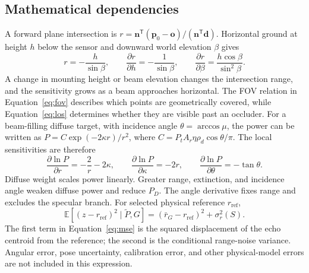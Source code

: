 \documentclass[11pt,letterpaper]{article}
\newcommand{\vect}[1]{\mathbf #1}
\begin{document}
\subsection{Mathematical dependencies}
A forward plane intersection is $r=\vect n^{\mathsf T}(\vect p_0-\vect o)/(\vect n^{\mathsf T}\vect d)$. Horizontal ground at height $h$ below the sensor and downward world elevation $\beta$ gives
\begin{equation}\label{eq:height}
r=-\frac{h}{\sin\beta},\qquad \frac{\partial r}{\partial h}=-\frac1{\sin\beta},\qquad
\frac{\partial r}{\partial\beta}=\frac{h\cos\beta}{\sin^2\beta}.
\end{equation}
A change in mounting height or beam elevation changes the intersection range, and the sensitivity grows as a beam approaches horizontal. The FOV relation in Equation~\eqref{eq:fov} describes which points are geometrically covered, while Equation~\eqref{eq:los} determines whether they are visible past an occluder. For a beam-filling diffuse target, with incidence angle $\theta=\arccos\mu$, the power can be written as $P=C\exp(-2\kappa r)/r^2$, where $C=P_tA_r\eta\rho_d\cos\theta/\pi$. The local sensitivities are therefore
\begin{equation}\label{eq:derivatives}
\frac{\partial\ln P}{\partial r}=-\frac2r-2\kappa,\qquad
\frac{\partial\ln P}{\partial\kappa}=-2r,\qquad
\frac{\partial\ln P}{\partial\theta}=-\tan\theta.
\end{equation}
Diffuse weight scales power linearly. Greater range, extinction, and incidence angle weaken diffuse power and reduce $P_D$. The angle derivative fixes range and excludes the specular branch. For selected physical reference $r_{\mathrm{ref}}$,
\begin{equation}\label{eq:mse}
\mathbb E[(z-r_{\mathrm{ref}})^2\mid\widetilde P,G]=(\bar r_G-r_{\mathrm{ref}})^2+\sigma_r^2(S).
\end{equation}
The first term in Equation~\eqref{eq:mse} is the squared displacement of the echo centroid from the reference; the second is the conditional range-noise variance. Angular error, pose uncertainty, calibration error, and other physical-model errors are not included in this expression.
\end{document}
